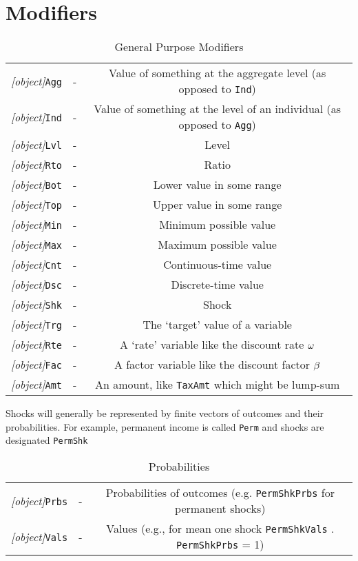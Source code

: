 \documentclass[12pt]{econtex}
\begin{document}
\section{Modifiers}
\begin{table}[h]
	\centering
	\begin{tabular}{|>{\ttfamily}ccc|} 		
		\hline
   \textit{[object]}\texttt{Agg} & - & Value of something at the aggregate level (as opposed to \texttt{Ind})
\\ \textit{[object]}\texttt{Ind} & - & Value of something at the level of an individual (as opposed to \texttt{Agg})
\\ \textit{[object]}\texttt{Lvl} & - & Level 
\\ \textit{[object]}\texttt{Rto} & - & Ratio 
\\ \textit{[object]}\texttt{Bot} & - & Lower value in some range 
\\ \textit{[object]}\texttt{Top} & - & Upper value in some range 
\\ \textit{[object]}\texttt{Min} & - & Minimum possible value 
\\ \textit{[object]}\texttt{Max} & - & Maximum possible value 
\\ \textit{[object]}\texttt{Cnt} & - & Continuous-time value
\\ \textit{[object]}\texttt{Dsc} & - & Discrete-time value
\\ \textit{[object]}\texttt{Shk} & - & Shock 
\\ \textit{[object]}\texttt{Trg} & - & The `target' value of a variable 
\\ \textit{[object]}\texttt{Rte} & - & A `rate' variable like the discount rate $\omega$
\\ \textit{[object]}\texttt{Fac} & - & A factor variable like the discount factor $\beta$
\\ \textit{[object]}\texttt{Amt} & - & An amount, like \texttt{TaxAmt} which might be lump-sum
\\ 	\hline
	\end{tabular}
	\caption{General Purpose Modifiers}
	\label{table:General}
\end{table}	


Shocks will generally be represented by finite vectors of outcomes and their probabilities.  For example, permanent income is called \texttt{Perm} and shocks are designated \texttt{PermShk}
\begin{table}[ht]
	\centering
	\begin{tabular}{|>{\ttfamily}ccc|} 		
		\hline
   \textit{[object]}\texttt{Prbs} & - & Probabilities of outcomes (e.g. \texttt{PermShkPrbs} for permanent shocks) 
\\ \textit{[object]}\texttt{Vals} & - & Values (e.g., for mean one shock \texttt{PermShkVals} . \texttt{PermShkPrbs} = 1) 
\\ 	\hline
	\end{tabular}
	\caption{Probabilities}
	\label{table:Probabilities}
\end{table}	
\end{document}
